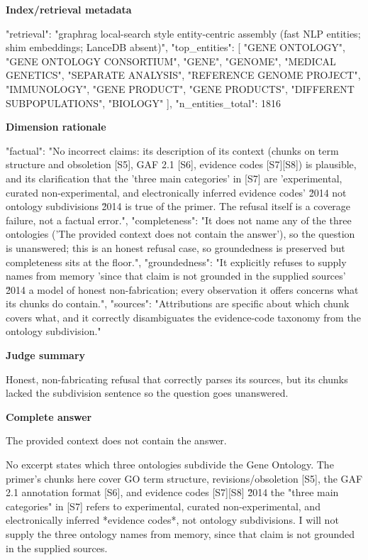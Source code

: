 \documentclass[10pt]{article}
\begin{document}
\textbf{Index/retrieval metadata}
\begin{EvidenceText}
{
  "retrieval": "graphrag local-search style entity-centric assembly (fast NLP entities; shim embeddings; LanceDB absent)",
  "top_entities": [
    "GENE ONTOLOGY",
    "GENE ONTOLOGY CONSORTIUM",
    "GENE",
    "GENOME",
    "MEDICAL GENETICS",
    "SEPARATE ANALYSIS",
    "REFERENCE GENOME PROJECT",
    "IMMUNOLOGY",
    "GENE PRODUCT",
    "GENE PRODUCTS",
    "DIFFERENT SUBPOPULATIONS",
    "BIOLOGY"
  ],
  "n_entities_total": 1816
}
\end{EvidenceText}

\textbf{Dimension rationale}
\begin{EvidenceText}
{
  "factual": "No incorrect claims: its description of its context (chunks on term structure and obsoletion [S5], GAF 2.1 [S6], evidence codes [S7][S8]) is plausible, and its clarification that the 'three main categories' in [S7] are 'experimental, curated non-experimental, and electronically inferred evidence codes' \u2014 not ontology subdivisions \u2014 is true of the primer. The refusal itself is a coverage failure, not a factual error.",
  "completeness": "It does not name any of the three ontologies ('The provided context does not contain the answer'), so the question is unanswered; this is an honest refusal case, so groundedness is preserved but completeness sits at the floor.",
  "groundedness": "It explicitly refuses to supply names from memory 'since that claim is not grounded in the supplied sources' \u2014 a model of honest non-fabrication; every observation it offers concerns what its chunks do contain.",
  "sources": "Attributions are specific about which chunk covers what, and it correctly disambiguates the evidence-code taxonomy from the ontology subdivision."
}
\end{EvidenceText}

\textbf{Judge summary}
\begin{EvidenceText}
Honest, non-fabricating refusal that correctly parses its sources, but its chunks lacked the subdivision sentence so the question goes unanswered.
\end{EvidenceText}

\textbf{Complete answer}
\begin{AnswerText}
The provided context does not contain the answer.

No excerpt states which three ontologies subdivide the Gene Ontology. The primer's chunks here cover GO term structure, revisions/obsoletion [S5], the GAF 2.1 annotation format [S6], and evidence codes [S7][S8] \u2014 the "three main categories" in [S7] refers to experimental, curated non-experimental, and electronically inferred *evidence codes*, not ontology subdivisions. I will not supply the three ontology names from memory, since that claim is not grounded in the supplied sources.
\end{AnswerText}
\end{document}
